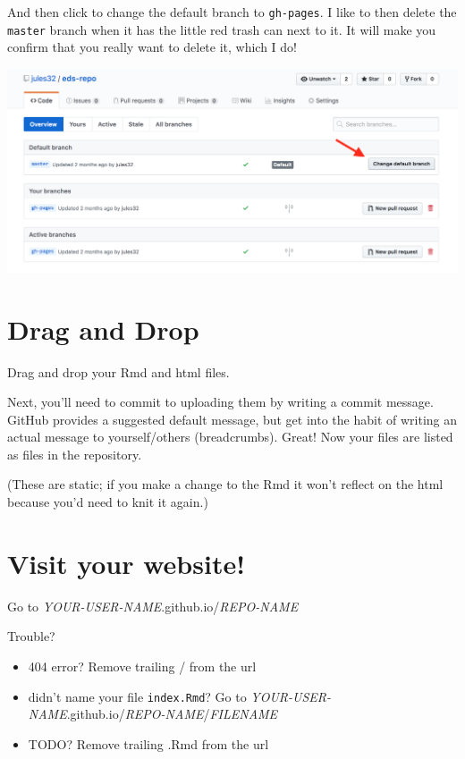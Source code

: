 \documentclass[]{book}
\providecommand{\tightlist}{%
  \setlength{\itemsep}{0pt}\setlength{\parskip}{0pt}}
\begin{document}
And then click to change the default branch to \texttt{gh-pages}. I like to then delete the \texttt{master} branch when it has the little red trash can next to it. It will make you confirm that you really want to delete it, which I do!

\includegraphics[width=0.8\linewidth]{img/github-change-branch}

\hypertarget{drag-and-drop}{%
\section{Drag and Drop}\label{drag-and-drop}}

Drag and drop your Rmd and html files.

Next, you'll need to commit to uploading them by writing a commit message. GitHub provides a suggested default message, but get into the habit of writing an actual message to yourself/others (breadcrumbs). Great! Now your files are listed as files in the repository.

(These are static; if you make a change to the Rmd it won't reflect on the html because you'd need to knit it again.)

\hypertarget{visit-your-website}{%
\section{Visit your website!}\label{visit-your-website}}

Go to \emph{YOUR-USER-NAME}.github.io/\emph{REPO-NAME}

Trouble?

\begin{itemize}
\tightlist
\item
  404 error? Remove trailing / from the url
\item
  didn't name your file \texttt{index.Rmd}? Go to \emph{YOUR-USER-NAME}.github.io/\emph{REPO-NAME}/\emph{FILENAME}
\item
  TODO? Remove trailing .Rmd from the url
\end{itemize}
\end{document}
